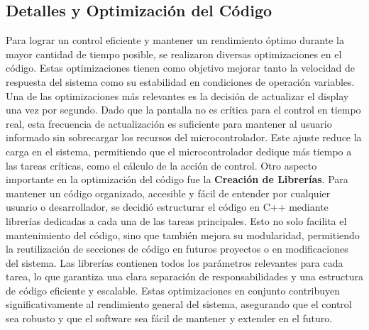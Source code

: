 \subsection{Detalles y Optimización del Código}
Para lograr un control eficiente y mantener un rendimiento óptimo durante la mayor cantidad de tiempo posible, se realizaron diversas optimizaciones en el código. Estas optimizaciones tienen como objetivo mejorar tanto la velocidad de respuesta del sistema como su estabilidad en condiciones de operación variables.
Una de las optimizaciones más relevantes es la decisión de actualizar el display una vez por segundo. Dado que la pantalla no es crítica para el control en tiempo real, esta frecuencia de actualización es suficiente para mantener al usuario informado sin sobrecargar los recursos del microcontrolador. Este ajuste reduce la carga en el sistema, permitiendo que el microcontrolador dedique más tiempo a las tareas críticas, como el cálculo de la acción de control.
Otro aspecto importante en la optimización del código fue la \textbf{Creación de Librerías}. Para mantener un código organizado, accesible y fácil de entender por cualquier usuario o desarrollador, se decidió estructurar el código en C++ mediante librerías dedicadas a cada una de las tareas principales. Esto no solo facilita el mantenimiento del código, sino que también mejora su modularidad, permitiendo la reutilización de secciones de código en futuros proyectos o en modificaciones del sistema. Las librerías contienen todos los parámetros relevantes para cada tarea, lo que garantiza una clara separación de responsabilidades y una estructura de código eficiente y escalable.
Estas optimizaciones en conjunto contribuyen significativamente al rendimiento general del sistema, asegurando que el control sea robusto y que el software sea fácil de mantener y extender en el futuro.